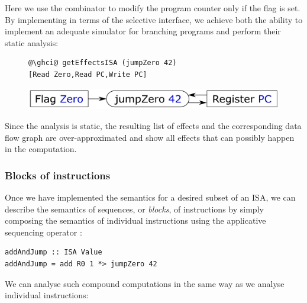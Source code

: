 \noindent
Here we use the  combinator to modify the program counter only if
the  flag is set. By implementing  in terms of the
selective interface, we achieve both the ability to implement an adequate
simulator for branching programs and perform their static analysis:

\begin{figure}[!h]
 \begin{minipage}{0.43\textwidth}
\raggedleft
\begin{verbatim}
@\ghci@ getEffectsISA (jumpZero 42)
[Read Zero,Read PC,Write PC]
\end{verbatim}
 \end{minipage}
 \begin{minipage}{0.54\textwidth}
  \centering
  \includegraphics[scale=0.3]{fig/jumpZero.pdf}
 \end{minipage}
\end{figure}

\noindent
Since the analysis is static, the resulting list of effects and the
corresponding data flow graph are over-approximated and show all effects that
can possibly happen in the computation.


\subsubsection{Blocks of instructions}

Once we have implemented the semantics for a desired subset of an ISA, we can
describe the semantics of sequences, or \emph{blocks}, of instructions by
simply composing the semantics of individual instructions using the applicative
sequencing operator \hs{(*>)}:

\vspace{1mm}
\begin{verbatim}
addAndJump :: ISA Value
addAndJump = add R0 1 *> jumpZero 42
\end{verbatim}
\newpage

\noindent
We can analyse such compound computations in the same way as we analyse
individual instructions:

